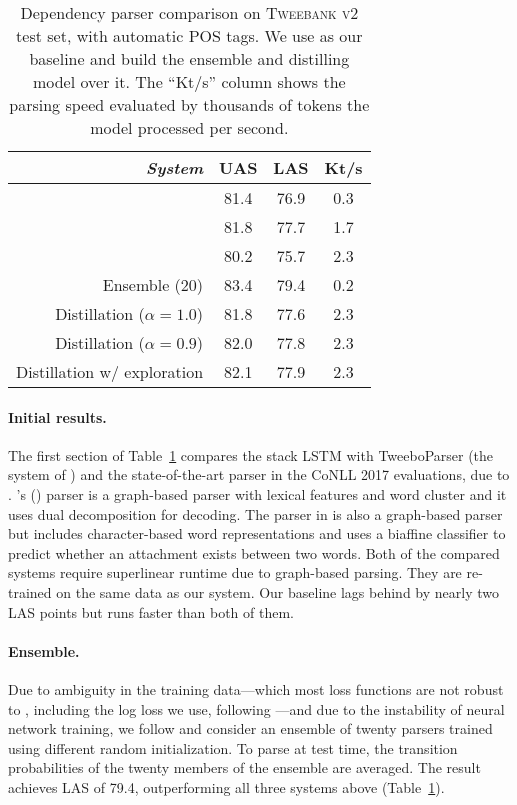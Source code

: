 \documentclass[11pt,a4paper]{article}
\newcommand{\Citeposs}[2][]{\Citeauthor{#2}'s (\citeyear[#1]{#2})}
\begin{document}
\begin{table}[t]
	\centering
	\begin{tabular}{rccc}
\it System & UAS & LAS & Kt/s \\
		\hline
		\citet{kong-EtAl:2014:EMNLP2014} & 81.4 & 76.9 & 0.3 \\
		\citet{dozat-qi-manning:2017:K17-3} & 81.8 & 77.7 & 1.7 \\
\hdashline
\citet{ballesteros-dyer-smith:2015:EMNLP} & 80.2 & 75.7 & 2.3 \\
		Ensemble (20) & 83.4 & 79.4 & 0.2 \\
		Distillation ($\alpha =1.0$) & 81.8 & 77.6 & 2.3 \\
		Distillation ($\alpha =0.9$) & 82.0 & 77.8 & 2.3 \\		
		Distillation w/ exploration & 82.1 & 77.9 & 2.3 \\
\end{tabular}
	\caption{Dependency parser comparison on \textsc{Tweebank v2} test set,
           with automatic POS tags. We use \citet{ballesteros-dyer-smith:2015:EMNLP}
           as our baseline and build the ensemble and distilling model over it.
           The ``Kt/s'' column shows
           the parsing speed evaluated by thousands of tokens
           the model processed per second.
            \label{tbl:parse-result}}
\end{table}

\paragraph{Initial results.}  The first section of Table~\ref{tbl:parse-result} compares
the stack LSTM with {\sc TweeboParser} (the system 
of \citealp{kong-EtAl:2014:EMNLP2014}) and the state-of-the-art parser
in the CoNLL 2017 evaluations, due to
 \citet{dozat-qi-manning:2017:K17-3}.
 \Citeposs{kong-EtAl:2014:EMNLP2014} parser is a graph-based
parser with lexical features and word cluster and it uses dual decomposition
for decoding. The parser in \citet{dozat-qi-manning:2017:K17-3} is also a graph-based parser
but includes character-based word representations and uses a biaffine classifier
to predict whether an attachment exists between two words.
Both of the compared systems require superlinear runtime due to graph-based parsing. 
They are re-trained on the same data as our
system.
Our baseline lags behind by nearly two LAS
points but runs faster than both of them.

\paragraph{Ensemble.}  Due to ambiguity in the training
data---which most loss functions are not robust to \citep{Frnay2014ClassificationIT}, including the log loss we use, following
\citet{ballesteros-dyer-smith:2015:EMNLP}---and due to the instability
of neural network training, we follow \citet{Dietterich2000} and
consider an ensemble of twenty parsers trained using different random
initialization.  To parse at test time, the transition probabilities of the twenty
members of the ensemble are averaged.  The result achieves LAS of
79.4, outperforming all three systems above (Table~\ref{tbl:parse-result}).
\end{document}
